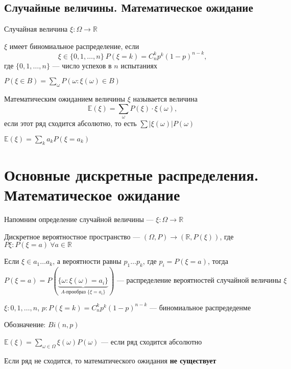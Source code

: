 \documentclass[a4paper, 10pt]{article}
\begin{document}
\subsection{Случайные величины. Математическое ожидание}
 Случайная величина $\xi:\Omega\rightarrow\mathbb{R}$

$\xi$ имеет биномиальное распределение, если
$$\xi\in\{0,1,\ldots,n\}\ P(\xi=k)=C_n^k p^k(1-p)^{n-k},$$
где $\{0,1,\ldots,n\}$ — число успехов в $n$ испытаниях

$P(\xi\in B)=\sum_{\omega} P(\omega:\xi(\omega)\in B)$

 Математическим ожиданием величины $\xi$ называется величина $$\mathbb{E}(\xi)=\sum_{\omega} P(\xi)\cdot\xi(\omega),$$
если этот ряд сходится абсолютно, то есть $\sum\left|\xi(\omega)\right|P(\omega)$

\theorem $\mathbb{E}(\xi)=\sum_{k}a_k P(\xi=a_k)$ 






\section{Основные дискретные распределения. Математическое ожидание}
Напомним определение случайной величины — $\xi:\Omega\rightarrow\mathbb{R}$

 Дискретное вероятностное пространство — $(\Omega,P)\rightarrow(\mathbb{R},P(\xi))$, где $P\xi:P(\xi=a)\ \forall a\in\mathbb{R}$

Если $\xi\in a_1\ldots a_k$, а вероятности равны $p_1\ldots p_k$, где $p_i=P(\xi=a)$, тогда
$$P(\xi=a)=P\left(\underbrace{\{\omega:\xi(\omega)=a_i\}}_{A\text{-прообраз }\{\xi=a_i\}}\right)\text{ — распределение вероятностей случайной величины }\xi$$

\ex $\xi:0,1,\ldots,n$, $p:P(\xi=k)=C_n^k p^k(1-p)^{n-k}$ — биномиальное распредеденме

Обозначение: $Bi(n,p)$

 $\mathbb{E}(\xi)=\sum_{\omega\in\Omega} \xi(\omega)P(\omega)$ — если ряд сходится абсолютно

Если ряд не сходится, то математического ожидания \textbf{не существует}
\end{document}
